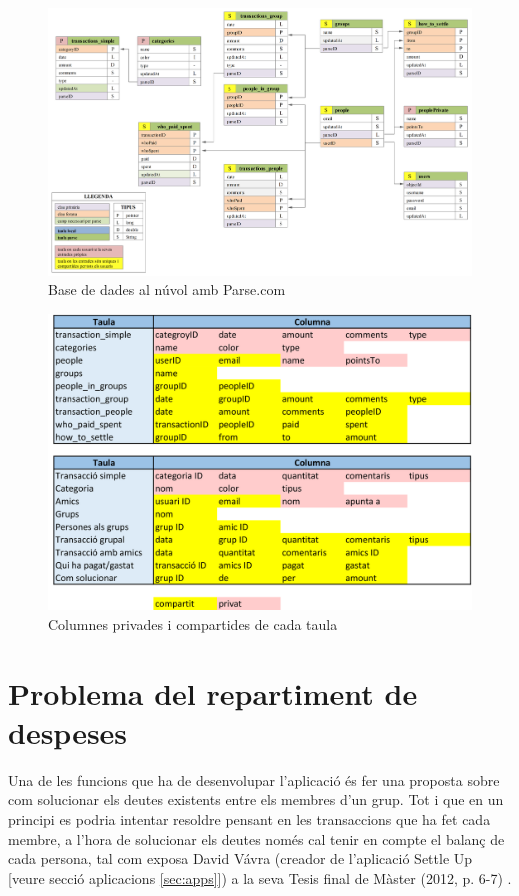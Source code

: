 \begin{figure}[ht]
\centering
\includegraphics[scale=0.44]{db_parse.png}
\caption{Base de dades al núvol amb Parse.com}\label{fig:db_parse}
\end{figure}

\begin{figure}[ht]
\centering
\includegraphics[scale=0.8]{db_private_shared.png}
\caption{Columnes privades i compartides de cada taula}\label{fig:db_private_shared}
\end{figure}


\section{Problema del repartiment de despeses}
Una de les funcions que ha de desenvolupar l'aplicació és fer una proposta sobre com solucionar els deutes existents entre els membres d'un grup. Tot i que en un principi es podria intentar resoldre pensant en les transaccions que ha fet cada membre, a l'hora de solucionar els deutes només cal tenir en compte el balanç de cada persona, tal com exposa David Vávra (creador de l'aplicació Settle Up [veure secció aplicacions \ref{sec:apps}]) a la seva Tesis final de Màster (2012, p. 6-7) \cite{Settle_up}.

